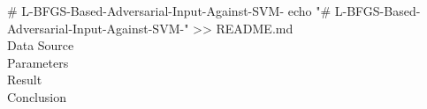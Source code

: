 # L-BFGS-Based-Adversarial-Input-Against-SVM-
echo "# L-BFGS-Based-Adversarial-Input-Against-SVM-" >> README.md
\\Data Source
\\Parameters
\\Result 
\\Conclusion
